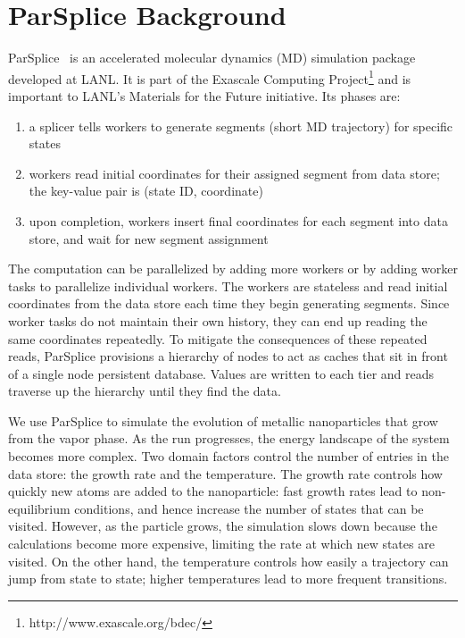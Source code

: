 \section{ParSplice Background}
\label{sec:parsplice}

ParSplice~\cite{perez:jctc20150parsplice} is an accelerated molecular dynamics
(MD) simulation package developed at LANL. It is part of the Exascale Computing
Project\footnote{http://www.exascale.org/bdec/} and is important to LANL's
Materials for the Future initiative. Its phases are:

\begin{enumerate}

  \item a splicer tells workers to generate segments (short MD trajectory) for
  specific states

  \item workers read initial coordinates for their assigned segment from data
  store; the key-value pair is (state ID, coordinate)

  \item upon completion, workers insert final coordinates for each segment into
  data store, and wait for new segment assignment

\end{enumerate}

The computation can be parallelized by adding more workers or by adding worker
tasks to parallelize individual workers.  The workers are stateless and read
initial coordinates from the data store each time they begin generating
segments. Since worker tasks do not maintain their own history, they can end up
reading the same coordinates repeatedly. To mitigate the consequences of these
repeated reads, ParSplice provisions a hierarchy of nodes to act as caches that
sit in front of a single node persistent database.  Values are written to each
tier and reads traverse up the hierarchy until they find the data. 

We use ParSplice to simulate the evolution of metallic nanoparticles that grow
from the vapor phase. As the run progresses, the energy landscape of the system
becomes more complex. Two domain factors control the number of entries in the
data store: the growth rate and the temperature. The growth rate controls how
quickly new atoms are added to the nanoparticle: fast growth rates lead to
non-equilibrium conditions, and hence increase the number of states that can be
visited. However, as the particle grows, the simulation slows down because the
calculations become more expensive, limiting the rate at which new states are
visited. On the other hand, the temperature controls how easily a trajectory
can jump from state to state; higher temperatures lead to more frequent
transitions.

